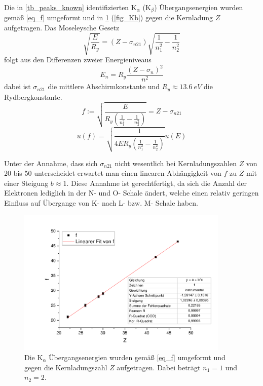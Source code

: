 \documentclass[
	a4paper,
	12pt,
	pagesize,
	ngerman
]{scrartcl}
\begin{document}
	Die in \cref{tb_peaks_known} identifizierten $\text{K}_\alpha$ ($\text{K}_\beta$) Übergangsenergien wurden gemäß \cref{eq_f} umgeformt und in \cref{fig_Ka} (\cref{fig_Kb}) gegen die Kernladung $Z$ aufgetragen. %
	Das Moseleysche Gesetz
	\begin{equation}
		\label{eq_moseley}
		\sqrt{\frac{E}{R_y}} = (Z-\sigma_{n21}) \sqrt{\frac{1}{n_1^2}-\frac{1}{n_2^2}}
	\end{equation}
	folgt aus den Differenzen zweier Energieniveaus
	\begin{equation}
		\label{eq_energie}
		E_n = R_y\frac{(Z-\sigma_n)^2}{n^2}
	\end{equation}
	dabei ist $\sigma_{n21}$ die mittlere Abschirmkonstante und $R_y\approx\SI{13.6}{eV}$ die Rydbergkonstante.
	\begin{equation}
		\label{eq_f}
		f := \sqrt{\frac{E}{R_y (\frac{1}{n_1^2}-\frac{1}{n_2^2})}} = Z -\sigma_{n21}
	\end{equation}
	\begin{equation}
		\label{eq_u_f}
		u(f) = \sqrt{\frac{1}{4 E R_y (\frac{1}{n_1^2}-\frac{1}{n_2^2})}} u(E)
	\end{equation}
	
	Unter der Annahme, dass sich $\sigma_{n21}$ nicht wesentlich bei Kernladungszahlen $Z$ von 20 bis 50 unterscheidet erwartet man einen linearen Abhängigkeit von $f$ zu $Z$ mit einer Steigung $b\approx1$. 
	Diese Annahme ist gerechtfertigt, da sich die Anzahl der Elektronen lediglich in der N- und O- Schale ändert, welche einen relativ geringen Einfluss auf Übergange von K- nach L- bzw. M- Schale haben.
	
	\begin{figure}[H]
		\includegraphics[width=0.9\textwidth]{Ka}
		\centering
		\caption{Die $\text{K}_\alpha$ Übergangsenergien wurden gemäß \cref{eq_f} umgeformt und gegen die Kernladungszahl $Z$ aufgetragen. Dabei beträgt $n_1=1$ und $n_2=2$.}
		\label{fig_Ka}
		\centering
	\end{figure}
	
\end{document}
